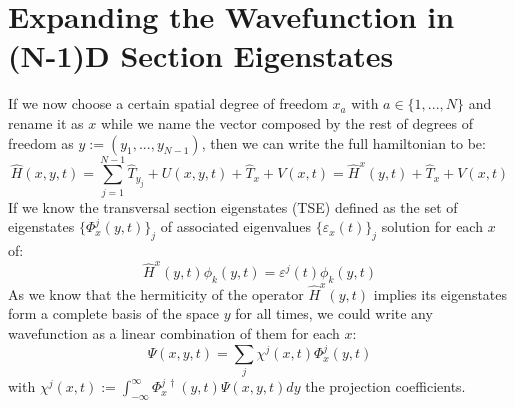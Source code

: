 \documentclass[11pt, a4paper]{article} %
\begin{document}
\newpage
\section{Expanding the Wavefunction in (N-1)D Section Eigenstates}
If we now choose a certain spatial degree of freedom $x_a$ with $a\in\{1,...,N\}$ and rename it as $x$ while we name the vector composed by the rest of degrees of freedom as $y:=(y_1,...,y_{N-1})$, then we can write the full hamiltonian to be:\vspace{-0.1cm}
\begin{equation}
\hat{H}(x, y, t)= \sum_{j=1}^{N-1}\hat{T}_{y_j}+U(x, y, t)+\hat{T}_x+V(x,t) = \hat{H}^x(y,t)+\hat{T}_x+V(x,t)
\end{equation}
If we know the transversal section eigenstates (TSE) defined as the set of eigenstates $\{ \Phi^j_x(y,t)\}_j$ of associated eigenvalues $\{\varepsilon_x(t) \}_j$ solution for each $x$ of:
\begin{equation}
\hat{H}^x(y,t)\phi_k(y,t)=\varepsilon^j(t)\phi_k(y,t)
\end{equation}
As we know that the hermiticity of the operator $\hat{H}^x(y,t)$ implies its eigenstates form a complete basis of the space $y$ for all times, we could write any wavefunction as a linear combination of them for each $x$:
\begin{equation}
\Psi(x,y,t)=\sum_j \chi^j(x,t) \Phi^j_x(y,t)
\end{equation}
with $\chi^j(x,t):= \int_{-\infty}^{\infty}\Phi^{j\ \dagger}_x(y,t) \Psi(x,y,t)dy$ the projection coefficients.
\end{document}
